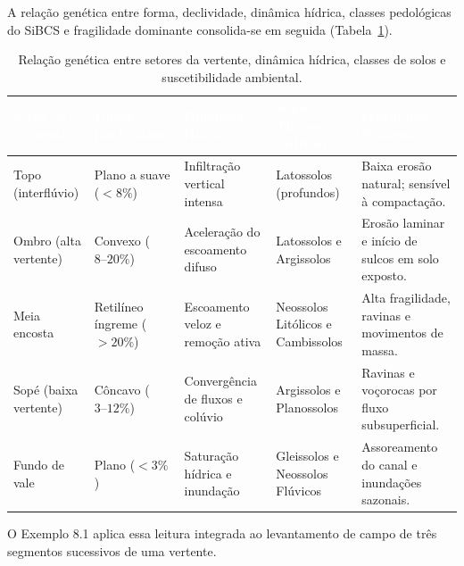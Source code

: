 A relação genética entre forma, declividade, dinâmica hídrica, classes pedológicas do SiBCS e fragilidade dominante consolida-se em seguida (Tabela~\ref{tab:topossequencia}).

\begin{table}[H]
\centering
\caption{Relação genética entre setores da vertente, dinâmica hídrica, classes de solos e suscetibilidade ambiental.}
\label{tab:topossequencia}
\renewcommand{\arraystretch}{1.20}
\small
\begin{tabularx}{\textwidth}{@{}p{2.3cm} p{2.2cm} p{2.9cm} p{2.7cm} >{\raggedright\arraybackslash}X@{}}
  \toprule
  \rowcolor{uefsNavy}
  \textcolor{white}{\bfseries Setor da Vertente} & \textcolor{white}{\bfseries Forma / Declividade} & \textcolor{white}{\bfseries Dinâmica Hídrica} & \textcolor{white}{\bfseries Solos Típicos (SiBCS)} & \textcolor{white}{\bfseries Fragilidade / Processo} \\
  \midrule
  Topo (interflúvio) & Plano a suave ($< 8\%$) & Infiltração vertical intensa & Latossolos (profundos) & Baixa erosão natural; sensível à compactação. \\
  \rowcolor{bgGray}
  Ombro (alta vertente) & Convexo ($8\text{--}20\%$) & Aceleração do escoamento difuso & Latossolos e Argissolos & Erosão laminar e início de sulcos em solo exposto. \\
  Meia encosta & Retilíneo íngreme ($> 20\%$) & Escoamento veloz e remoção ativa & Neossolos Litólicos e Cambissolos & Alta fragilidade, ravinas e movimentos de massa. \\
  \rowcolor{bgGray}
  Sopé (baixa vertente) & Côncavo ($3\text{--}12\%$) & Convergência de fluxos e colúvio & Argissolos e Planossolos & Ravinas e voçorocas por fluxo subsuperficial. \\
  Fundo de vale & Plano ($< 3\%$) & Saturação hídrica e inundação & Gleissolos e Neossolos Flúvicos & Assoreamento do canal e inundações sazonais. \\
  \bottomrule
\end{tabularx}
\end{table}

O Exemplo 8.1 aplica essa leitura integrada ao levantamento de campo de três segmentos sucessivos de uma vertente.

